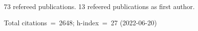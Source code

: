 73 refereed publications. 13 refeered publications as first author.

Total citations~=~2648; h-index~=~27 (2022-06-20)